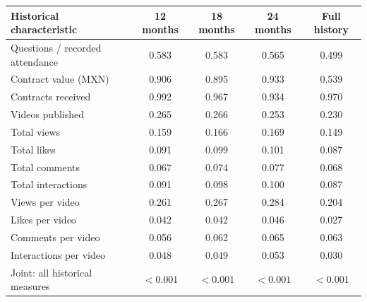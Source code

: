 \begingroup\small
\setlength{\tabcolsep}{3pt}
\renewcommand{\arraystretch}{1.25}
\noindent%
\begin{tabular*}{\linewidth}{@{\extracolsep{\fill}}lcccc@{}}
\toprule
Historical characteristic & 12 months & 18 months & 24 months & Full history \\
\midrule
Questions / recorded attendance & 0.583 & 0.583 & 0.565 & 0.499 \\
\addlinespace
Contract value (MXN) & 0.906 & 0.895 & 0.933 & 0.539 \\
Contracts received & 0.992 & 0.967 & 0.934 & 0.970 \\
\addlinespace
Videos published & 0.265 & 0.266 & 0.253 & 0.230 \\
Total views & 0.159 & 0.166 & 0.169 & 0.149 \\
Total likes & 0.091 & 0.099 & 0.101 & 0.087 \\
Total comments & 0.067 & 0.074 & 0.077 & 0.068 \\
Total interactions & 0.091 & 0.098 & 0.100 & 0.087 \\
Views per video & 0.261 & 0.267 & 0.284 & 0.204 \\
Likes per video & 0.042 & 0.042 & 0.046 & 0.027 \\
Comments per video & 0.056 & 0.062 & 0.065 & 0.063 \\
Interactions per video & 0.048 & 0.049 & 0.053 & 0.030 \\
\midrule
Joint: all historical measures & $<0.001$ & $<0.001$ & $<0.001$ & $<0.001$ \\
\bottomrule
\end{tabular*}\par\endgroup
